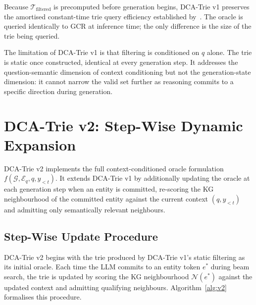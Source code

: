 Because $\mathcal{T}_{\text{filtered}}$ is precomputed before generation begins, DCA-Trie v1 preserves the amortised constant-time trie query efficiency established by~\citet{willard2023outlines}. The oracle is queried identically to GCR at inference time; the only difference is the size of the trie being queried.

The limitation of DCA-Trie v1 is that filtering is conditioned on $q$ alone. The trie is static once constructed, identical at every generation step. It addresses the question-semantic dimension of context conditioning but not the generation-state dimension: it cannot narrow the valid set further as reasoning commits to a specific direction during generation.

\section{DCA-Trie v2: Step-Wise Dynamic Expansion}
\label{sec:v2}

DCA-Trie v2 implements the full context-conditioned oracle formulation $f(\mathcal{G}, \mathcal{E}_q, q, y_{<t})$. It extends DCA-Trie v1 by additionally updating the oracle at each generation step when an entity is committed, re-scoring the KG neighbourhood of the committed entity against the current context $(q, y_{<t})$ and admitting only semantically relevant neighbours.

\subsection{Step-Wise Update Procedure}

DCA-Trie v2 begins with the trie produced by DCA-Trie v1's static filtering as its initial oracle. Each time the LLM commits to an entity token $e^*$ during beam search, the trie is updated by scoring the KG neighbourhood $\mathcal{N}(e^*)$ against the updated context and admitting qualifying neighbours. Algorithm~\ref{alg:v2} formalises this procedure.

